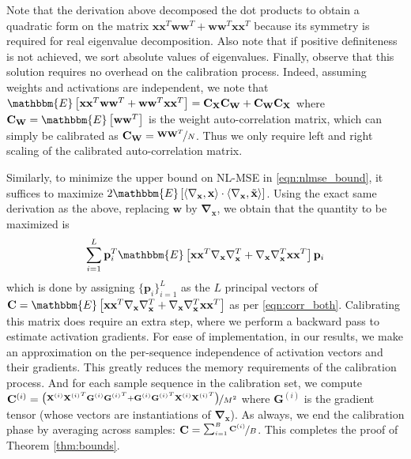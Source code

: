 \documentclass{article}
\theoremstyle{plain}
\begin{document}
Note that the derivation above decomposed the dot products to obtain a quadratic form on the matrix $\mathbf{x}\mathbf{x}^T\mathbf{w}\mathbf{w}^T+\mathbf{w}\mathbf{w}^T\mathbf{x}\mathbf{x}^T$ because its symmetry is required for real eigenvalue decomposition. Also note that if positive definiteness is not achieved, we sort absolute values of eigenvalues. Finally, observe that this solution requires no overhead on the calibration process. Indeed, assuming weights and activations are independent, we note that $\mathbbm{E}\left[\mathbf{x}\mathbf{x}^T\mathbf{w}\mathbf{w}^T+\mathbf{w}\mathbf{w}^T\mathbf{x}\mathbf{x}^T\right] = \mathbf{C}_\mathbf{X}\mathbf{C}_\mathbf{W}+\mathbf{C}_\mathbf{W}\mathbf{C}_\mathbf{X}$ where $\mathbf{C}_\mathbf{W}=\mathbbm{E}\left[\mathbf{w}\mathbf{w}^T\right]$ is the weight auto-correlation matrix, which can simply be calibrated as $\mathbf{C}_\mathbf{W}=\nicefrac{\mathbf{W}\mathbf{W}^T}{N}$. Thus we only require left and right scaling of the calibrated auto-correlation matrix.

Similarly, to minimize the upper bound on NL-MSE in \eqref{eqn:nlmse_bound}, it suffices to maximize $2\mathbbm{E}\left[ \langle\mathbf{\nabla}_{\mathbf{x}},\mathbf{x}\rangle \cdot\langle\mathbf{\nabla}_{\mathbf{x}},\tilde{\mathbf{x}}\rangle \right]$. Using the exact same derivation as the above, replacing $\mathbf{w}$ by $\mathbf{\nabla}_{\mathbf{x}}$, we obtain that the quantity to be maximized is
\begin{align*}
\sum_{i=1}^L\mathbf{p}_i^T\mathbbm{E}\left[\mathbf{x}\mathbf{x}^T\mathbf{\nabla}_{\mathbf{x}}\mathbf{\nabla}_{\mathbf{x}}^T+\mathbf{\nabla}_{\mathbf{x}}\mathbf{\nabla}_{\mathbf{x}}^T\mathbf{x}\mathbf{x}^T\right]\mathbf{p}_i
\end{align*}
which is done by assigning $\{\mathbf{p}_i\}_{i=1}^L$ as the $L$ principal vectors of $\mathbf{C}=\mathbbm{E}\left[\mathbf{x}\mathbf{x}^T\mathbf{\nabla}_{\mathbf{x}}\mathbf{\nabla}_{\mathbf{x}}^T+\mathbf{\nabla}_{\mathbf{x}}\mathbf{\nabla}_{\mathbf{x}}^T\mathbf{x}\mathbf{x}^T\right]$ as per \eqref{eqn:corr_both}. Calibrating this matrix does require an extra step, where we perform a backward pass to estimate activation gradients. For ease of implementation, in our results, we make an approximation on the per-sequence independence of activation vectors and their gradients. This greatly reduces the memory requirements of the calibration process. And for each sample sequence in the calibration set, we compute $\mathbf{C}^{(i)}=\nicefrac{\left(\mathbf{X}^{(i)}{\mathbf{X}^{(i)}}^T\mathbf{G}^{(i)}{\mathbf{G}^{(i)}}^T+\mathbf{G}^{(i)}{\mathbf{G}^{(i)}}^T\mathbf{X}^{(i)}{\mathbf{X}^{(i)}}^T\right)}{M^2} $ where $\mathbf{G}^{(i)}$ is the gradient tensor (whose vectors are instantiations of $\mathbf{\nabla}_{\mathbf{x}}$). As always, we end the calibration phase by averaging across samples: $\mathbf{C} = \nicefrac{\sum_{i=1}^B \mathbf{C}^{(i)}}{B}$. This completes the proof of Theorem \ref{thm:bounds}.
\end{document}
